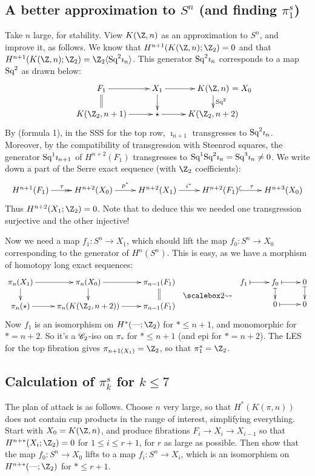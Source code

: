 \documentclass[11pt]{article}
\begin{document}
\subsection{A better approximation to \texorpdfstring{$S^n$}{Sn}
 (and finding \texorpdfstring{$\pi_1^s$}{the stable 1-stem})}
Take $n$ large, for stability. View $K(\Z,n)$ as an approximation to $S^n$, and improve it, as follows. We know that $H^{n+1}(K(\Z,n);\Z_2)=0$ and that $H^{n+1}(K(\Z,n);\Z_2)=\Z_2\langle\Squ^2\imath_n\rangle$. This generator $\textup{Sq}^2\imath_n$ corresponds to a map $\textup{Sq}^2$ as drawn below:
\[\xymatrix@R=5mm{
F_1\ar[r]\ar@{=}[d]&X_1\ar[d]\ar[r]&K(\Z,n)\makebox[0cm][l]{\,\,$=X_0$}\ar[d]^{\Squ^2}\\
K(\Z_2,n+1)\ar[r]&\star\ar[r]&K(\Z_2,n+2)
}\]
By (formula 1), in the SSS for the top row, $\imath_{n+1}$ transgresses to $\textup{Sq}^2\imath_n$. Moreover, by the compatibility of transgression with Steenrod squares, the generator $\textup{Sq}^1\imath_{n+1}$ of $H^{n+2}(F_1)$ transgresses to $\textup{Sq}^1\textup{Sq}^2\imath_{n}=\textup{Sq}^3\imath_{n}\neq0$.
We write down a part of the Serre exact sequence (with $\Z_2$ coefficients):
\[\xymatrix{
H^{n+1}(F_1)\ar@{->>}[r]^{\tau}&H^{n+2}(X_0)\ar[r]^{p^*}&H^{n+2}(X_1)\ar[r]^{i^*}&H^{n+2}(F_1)\ar@{^{(}->}[r]^{\tau}&H^{n+3}(X_0)
}\]
Thus $H^{n+2}(X_1;\Z_2)=0$. Note that to deduce this we needed one transgression surjective and the other injective!

Now we need a map $f_1:S^n\to X_1$, which should lift the map $f_0:S^n\to X_0$ corresponding to the generator of $H^n(S^n)$. This is easy, as we have a morphism of homotopy long exact sequences:
\[\xymatrix@R=5mm{
\pi_n(X_1)\ar[r]\ar[d]&\pi_n(X_0)\ar[r]\ar[d]&\pi_{n-1}(F_1)\ar@{=}[d]\\
\pi_n(\star)\ar[r]&\pi_n(K(\Z_2,n+2))\ar[r]&\pi_{n-1}(F_1)\\
}\raisebox{-.6cm}{\ \ $\bigrightsquig$\ \ }
\xymatrix@R=5mm{
f_1\ar@{|->}[r]&f_0\ar@{|->}[r]\ar@{|->}[d]&0\ar@{|->}[d]\\
&0\ar@{|->}[r]&0
}\]
Now $f_1$ is an isomorphism on $H^*(\DASH;\Z_2)$ for $*\leq n+1$, and 
monomorphic for $*=n+2$. So it's a $\mathscr{C}_2$-iso on $\pi_*$ for 
$*\leq n+1$ (and epi for $*=n+2$). The LES for the top fibration gives 
$\pi_{n+1(X_1)}=\Z_2$, so that $\pi_1^s=\Z_2$.

\subsection{Calculation of \texorpdfstring{$\pi_k^s$ for $k\leq7$}{stable 
k-stem, k<8}}
The plan of attack is as follows. Choose $n$ very large, so that $H^*(K(\pi,n))$
does not contain cup products in the range of interest, simplifying everything.
Start with $X_0=K(\Z,n)$, and produce fibrations $F_i\to X_i\to X_{i-1}$ so that
$H^{n+*}(X_i;\Z_2)=0$ for $1\leq i\leq r+1$, for $r$ as large as possible. Then 
show that the map $f_0:S^n\to X_0$ lifts to a map $f_i:S^n\to X_i$, which is an
isomorphism on $H^{n+*}(\DASH;\Z_2)$ for $*\leq r+1$.
\end{document}
